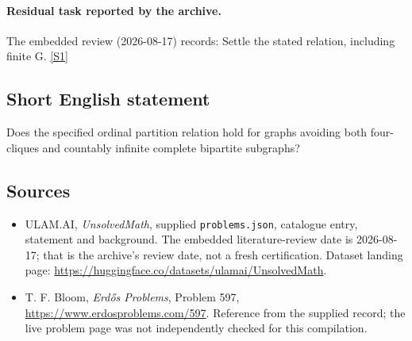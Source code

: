 \documentclass[11pt,a4paper]{article}
\newcommand{\sref}[2]{\hyperlink{source:#1:#2}{[S#2]}}
\begin{document}
\paragraph{Residual task reported by the archive.}

The embedded review (2026-08-17) records: Settle the stated relation, including finite G. \sref{statement}{1}

\subsection{Short English statement}

Does the specified ordinal partition relation hold for graphs avoiding both four-cliques and countably infinite complete bipartite subgraphs?

\subsection{Sources}

{\small

\begin{itemize}

\item[\hypertarget{source:statement:1}{S1}] ULAM.AI, \emph{UnsolvedMath}, supplied \texttt{problems.json}, catalogue entry, statement and background. The embedded literature-review date is 2026-08-17; that is the archive’s review date, not a fresh certification. Dataset landing page: \url{https://huggingface.co/datasets/ulamai/UnsolvedMath}.

\item[\hypertarget{source:statement:2}{S2}] T. F. Bloom, \emph{Erdős Problems}, Problem 597, \url{https://www.erdosproblems.com/597}. Reference from the supplied record; the live problem page was not independently checked for this compilation.

\end{itemize}

}

\label{end:statement}
\end{document}
